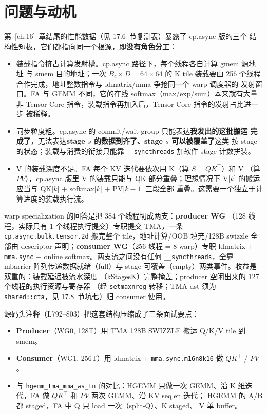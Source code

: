 \section{问题与动机}

第~\ref{ch:16}~章结尾的性能数据（见 17.6~节复测表）暴露了 cp.async 版的三个
结构性短板，它们都指向同一个根源，即\textbf{没有角色分工}：

\begin{itemize}
  \item 装载指令挤占计算发射槽。cp.async 路径下，每个线程各自计算 gmem 源地址
        与 smem 目的地址；一次 $B_c \times D = 64 \times 64$ 的 K tile 装载要由
        256 个线程合作完成，地址整数指令与 ldmatrix/mma 争抢同一个 warp 调度器的
        发射窗口。FA 与 GEMM 不同，它的在线 softmax（max/exp/sum）本来就有大量
        非 Tensor Core 指令，装载指令再加入后，Tensor Core 指令的发射占比进一步
        被稀释。
  \item 同步粒度粗。cp.async 的 commit/wait group 只能表达\textbf{我发出的这批搬运
        完成了}，无法表达\textbf{stage $s$ 的数据到齐了、stage $s$ 可以被覆盖了}这类
        按 stage 的状态；装载与消费的衔接只能靠
        \texttt{\_\allowbreak{}\_\allowbreak{}syncthreads} 加软件 stage 计数拼装。
  \item V 的装载深度不足。FA 每个 KV 迭代要依次用 K（算 $S = QK^\top$）和 V
        （算 $PV$），cp.async 版里 V 的装载只能与 QK 部分重叠；理想情况下
        V[$k$] 的搬运应当与 QK[$k$] $+$ softmax[$k$] $+$ PV[$k{-}1$] 三段全部
        重叠。这需要一个独立于计算进度的装载执行流。
\end{itemize}

warp specialization 的回答是把 384 个线程切成两支：\textbf{producer WG}
（128 线程，实际只有 1 个线程执行提交）专职提交 TMA，一条
\texttt{cp.\allowbreak{}async.\allowbreak{}bulk.\allowbreak{}tensor.2d} 搬完整个 tile，地址计算/OOB 填充/128B swizzle
全部由 descriptor 声明；\textbf{consumer WG}（256 线程 = 8 warp）专职
ldmatrix + \texttt{mma.sync} + online softmax。两支流之间没有任何
\texttt{\_\allowbreak{}\_\allowbreak{}syncthreads}，全靠 mbarrier 阵列传递数据就绪（full）与
stage 可覆盖（empty）两类事件。收益是双重的：装载延迟被流水深度
（kStagesK）完整掩盖；producer 空闲出来的 127 个线程的执行资源与寄存器
（经 \texttt{setmaxnreg} 转移；TMA dst 须为 \texttt{shared::cta}，见 17.8~节坑七）归 consumer 使用。

源码头注释（L792--803）把这套结构压缩成了三条面试要点：

\begin{itemize}
  \item \textbf{Producer}（WG0, 128T）用 TMA 128B SWIZZLE 搬运 Q/K/V tile 到
        smem。
  \item \textbf{Consumer}（WG1, 256T）用 ldmatrix $+$
        \texttt{mma.\allowbreak{}sync.\allowbreak{}m16n8k16} 做 $QK^\top$ / $PV$。
  \item 与 \texttt{hgemm\_tma\_mma\_ws\_tn} 的对比：HGEMM 只做一次 GEMM、沿
        K 维迭代，FA 做 $QK^\top$ 和 $PV$ 两次 GEMM、沿 KV seqlen 迭代；
        HGEMM 的 A/B 都 staged，FA 中 Q 只 load 一次（split-Q）、K staged、
        V 单 buffer。
\end{itemize}


